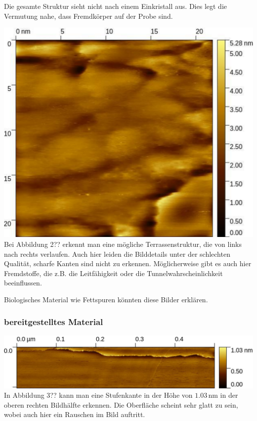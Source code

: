 \documentclass[12pt,a4paper]{scrartcl}
\numberwithin{equation}{section} %
\begin{document}
Die gesamte Struktur sieht nicht nach einem Einkristall aus. Dies legt
die Vermutung nahe, dass Fremdkörper auf der Probe sind.

\includegraphics{../media/B2.5/Gold_Stufenkante.pdf} Bei Abbildung 2?? erkennt man
eine mögliche Terrassenstruktur, die von links nach rechts verlaufen.
Auch hier leiden die Bilddetails unter der schlechten Qualität, scharfe
Kanten sind nicht zu erkennen. Möglicherweise gibt es auch hier
Fremdstoffe, die z.B. die Leitfähigkeit oder die
Tunnelwahrscheinlichkeit beeinflussen.

Biologisches Material wie Fettspuren könnten diese Bilder erklären.

\hypertarget{bereitgestelltes-material}{%
\subsubsection{bereitgestelltes
Material}\label{bereitgestelltes-material}}

\includegraphics{../media/B2.5/Stufenkante.pdf} In Abbildung 3?? kann man eine
Stufenkante in der Höhe von $1.03\mathrm{\,nm}$ in der oberen rechten
Bildhälfte erkennen. Die Oberfläche scheint sehr glatt zu sein, wobei
auch hier ein Rauschen im Bild auftritt.
\end{document}
